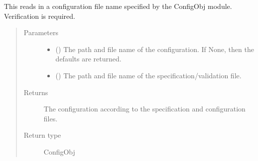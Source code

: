 \documentclass[letterpaper,10pt,english]{sphinxmanual}
\begin{document}
\begin{fulllineitems}
\label{\detokenize{docstrings/ifa_smeargle.core.configuration:ifa_smeargle.core.configuration.read_configuration_file}}
This reads in a configuration file name specified by the
ConfigObj module. Verification is required.
\begin{quote}\begin{description}
\item[{Parameters}] \leavevmode\begin{itemize}
\item {} 
 () \textendash{} The path and file name of the configuration. If None, then
the defaults are returned.

\item {} 
 () \textendash{} The path and file name of the specification/validation file.

\end{itemize}

\item[{Returns}] \leavevmode
{} \textendash{} The configuration according to the specification and
configuration files.

\item[{Return type}] \leavevmode
ConfigObj

\end{description}\end{quote}

\end{fulllineitems}

\end{document}
